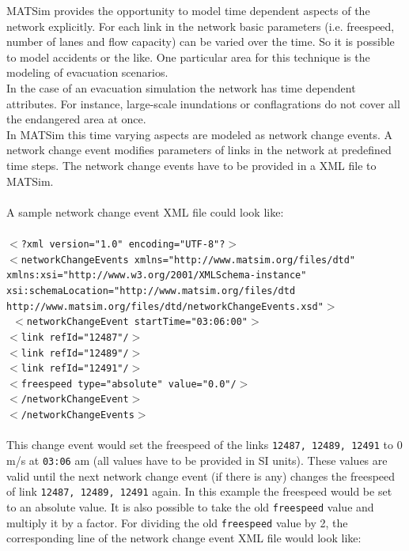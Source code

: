 MATSim provides the opportunity to model time dependent aspects of  the network explicitly. For each link in the network basic parameters  (i.e. freespeed, number of lanes and flow capacity) can be varied over  the time. So it is possible to model accidents or the like. One  particular area for this technique is the modeling of evacuation  scenarios.
\\  In the case of an evacuation simulation the network has time dependent  attributes. For instance, large-scale inundations or conflagrations do  not cover all the endangered area at once.
\\  In MATSim this time varying aspects are modeled as network change  events. A network change event modifies parameters of links in the  network at predefined time steps. The network change events have to be  provided in a XML file to MATSim.
\\
\\  A sample network change event XML file could look like:
\\
\\
\texttt{$<$?xml version="1.0" encoding="UTF-8"?$>$
\\  $<$networkChangeEvents xmlns="http://www.matsim.org/files/dtd"  xmlns:xsi="http://www.w3.org/2001/XMLSchema-instance"  xsi:schemaLocation="http://www.matsim.org/files/dtd  http://www.matsim.org/files/dtd/networkChangeEvents.xsd"$>$}
\\
\texttt{ $<$networkChangeEvent startTime="03:06:00"$>$
\\   $<$link refId="12487"/$>$
\\   $<$link refId="12489"/$>$
\\   $<$link refId="12491"/$>$
\\   $<$freespeed type="absolute" value="0.0"/$>$
\\   $<$/networkChangeEvent$>$}
\\
\texttt{$<$/networkChangeEvents$>$}
\\
\\  This change event would set the freespeed of the links 
\texttt{12487, 12489, 12491} to 0 m/s at 
\texttt{03:06}  am (all values have to be provided in SI units). These values are valid  until the next network change event (if there is any) changes the  freespeed of link 
\texttt{12487, 12489, 12491} again. In this example the freespeed would be set to an absolute value. It is also possible to take the old 
\texttt{freespeed} value and multiply it by a factor. For dividing the old 
\texttt{freespeed} value by 2, the corresponding line of the network change event XML file would look like:
